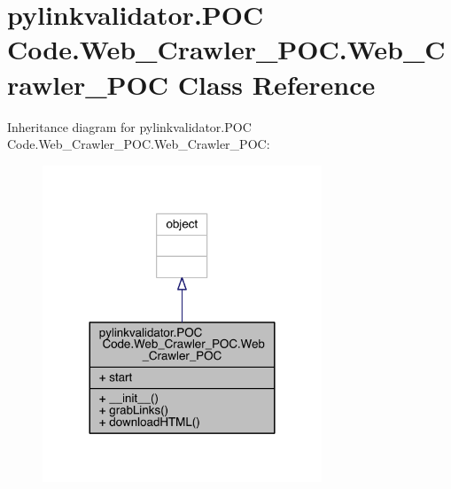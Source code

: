\hypertarget{classpylinkvalidator_1_1_p_o_c_01_code_1_1_web___crawler___p_o_c_1_1_web___crawler___p_o_c}{}\section{pylinkvalidator.\+P\+OC Code.\+Web\+\_\+\+Crawler\+\_\+\+P\+O\+C.\+Web\+\_\+\+Crawler\+\_\+\+P\+OC Class Reference}
\label{classpylinkvalidator_1_1_p_o_c_01_code_1_1_web___crawler___p_o_c_1_1_web___crawler___p_o_c}


Inheritance diagram for pylinkvalidator.\+P\+OC Code.\+Web\+\_\+\+Crawler\+\_\+\+P\+O\+C.\+Web\+\_\+\+Crawler\+\_\+\+P\+OC\+:
\nopagebreak
\begin{figure}[H]
\begin{center}
\leavevmode
\includegraphics[width=236pt]{classpylinkvalidator_1_1_p_o_c_01_code_1_1_web___crawler___p_o_c_1_1_web___crawler___p_o_c__inherit__graph}
\end{center}
\end{figure}



